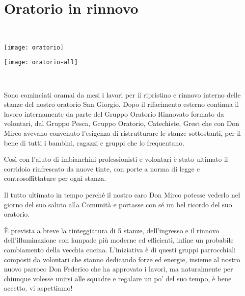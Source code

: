 \section{Oratorio in rinnovo}

\begin{figure*}[!b]
  \begin{minipage}{0.1\textwidth}
~
  \end{minipage}
  \begin{minipage}{0.26\textwidth}
  \texttt{[image: oratorio]}
  \end{minipage}
  \hfill
  \begin{minipage}{0.44\textwidth}
  \texttt{[image: oratorio-all]}
  \end{minipage}
  \begin{minipage}{0.1\textwidth}
~
  \end{minipage}
\end{figure*}

Sono cominciati oramai da mesi i lavori per il ripristino e rinnovo interno delle stanze del nostro oratorio San Giorgio. Dopo il rifacimento esterno continua il lavoro internamente da parte del Gruppo Oratorio Rinnovato formato da volontari, dal Gruppo Pesca, Gruppo Oratorio, Catechiste, Grest che con Don Mirco avevano convenuto l'esigenza di ristrutturare le stanze sottostanti, per il bene di tutti i bambini, ragazzi e gruppi che lo frequentano.

Così con l'aiuto di imbianchini professionisti e volontari è stato ultimato il corridoio rinfrescato da nuove tinte, con porte a norma di legge e controsoffittature per ogni stanza.

Il tutto ultimato in tempo perché il nostro caro Don Mirco potesse vederlo nel giorno del suo saluto alla Comunità e portasse con sé un bel ricordo del suo oratorio.

È prevista a breve la tinteggiatura di 5 stanze, dell'ingresso e il rinnovo dell'illuminazione con lampade più moderne ed efficienti, infine un probabile cambiamento della vecchia cucina. L'iniziativa è di questi gruppi parrocchiali composti da volontari che stanno dedicando forze ed energie, insieme al nostro nuovo parroco Don Federico che ha approvato i lavori, ma naturalmente per chiunque volesse unirsi alle squadre e regalare un po' del suo tempo, è bene accetto. vi aspettiamo!

